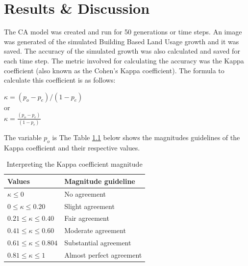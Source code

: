 \chapter{Results \& Discussion} %
The CA model was created and run for 50 generations or time steps. An image was generated of the simulated Building Based Land Usage growth and it was saved. The accuracy of the simulated growth was also calculated and saved for each time step. The metric involved for calculating the accuracy  was the Kappa coefficient (also known as the Cohen's Kappa coefficient). The formula to calculate this coefficient is as follows:
\begin{center}
$\kappa = (p_o - p_e) / (1 - p_e)$\\
or\\
$\kappa = \frac{(p_o - p_e)}{(1 - p_e)}$
\end{center}
The variable $p_o$ is 
The Table \ref{table:kap} below shows the magnitudes guidelines of the Kappa coefficient and their respective values.\cite{kappatb}
\begin{table}[H]
\centering
\caption{Interpreting the Kappa coefficient magnitude}
\label{table:kap}
\begin{tabular}{@{}ll@{}}
\toprule
\multicolumn{1}{l}{Values} & \multicolumn{1}{l}{Magnitude guideline} \\ \midrule
$\kappa \leq 0$                & No agreement                            \\
$0 \leq \kappa \leq 0.20$                     & Slight agreement                        \\
$0.21 \leq \kappa \leq 0.40$                  & Fair agreement                          \\
$0.41 \leq \kappa \leq 0.60$                  & Moderate agreement                      \\
$0.61 \leq \kappa \leq 0.804$                  & Substantial agreement                   \\
$0.81 \leq \kappa \leq 1$                     & Almost perfect agreement                \\ \bottomrule
\end{tabular}
\end{table}
\label{Chapter4} %
